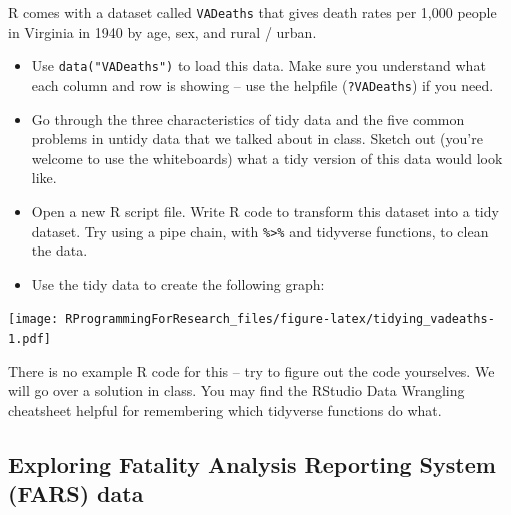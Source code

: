 \documentclass[]{book}
\providecommand{\tightlist}{%
  \setlength{\itemsep}{0pt}\setlength{\parskip}{0pt}}
\theoremstyle{definition}
\theoremstyle{definition}
\theoremstyle{definition}
\theoremstyle{remark}
\begin{document}
R comes with a dataset called \texttt{VADeaths} that gives death rates
per 1,000 people in Virginia in 1940 by age, sex, and rural / urban.

\begin{itemize}
\tightlist
\item
  Use \texttt{data("VADeaths")} to load this data. Make sure you
  understand what each column and row is showing -- use the helpfile
  (\texttt{?VADeaths}) if you need.
\item
  Go through the three characteristics of tidy data and the five common
  problems in untidy data that we talked about in class. Sketch out
  (you're welcome to use the whiteboards) what a tidy version of this
  data would look like.
\item
  Open a new R script file. Write R code to transform this dataset into
  a tidy dataset. Try using a pipe chain, with
  \texttt{\%\textgreater{}\%} and tidyverse functions, to clean the
  data.
\item
  Use the tidy data to create the following graph:
\end{itemize}

\texttt{[image: RProgrammingForResearch\_files/figure-latex/tidying\_vadeaths-1.pdf]}

There is no example R code for this -- try to figure out the code
yourselves. We will go over a solution in class. You may find the
RStudio Data Wrangling cheatsheet helpful for remembering which
tidyverse functions do what.

\subsection{Exploring Fatality Analysis Reporting System (FARS)
data}\label{exploring-fatality-analysis-reporting-system-fars-data}
\end{document}
